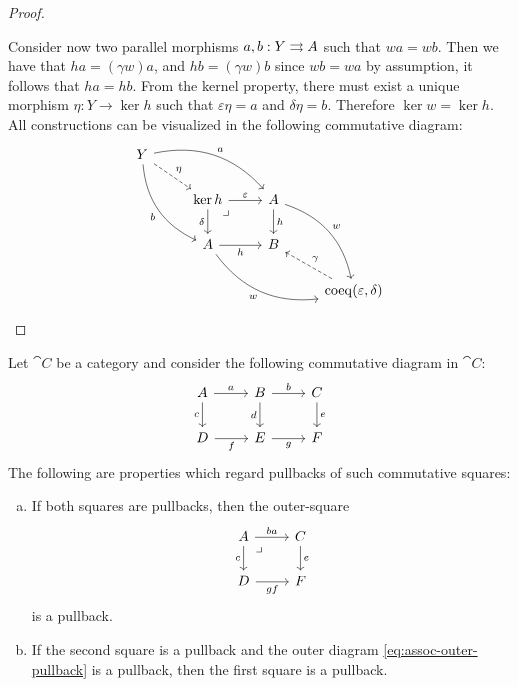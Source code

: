 \begin{proof}
\begin{enumerate}[(a)]
  Consider now two parallel morphisms \(a, b: Y \rightrightarrows A\) such that
  \(w a = w b\). Then we have that \(h a = (\gamma w) a\), and
  \(h b = (\gamma w) b\) since \(w b = w a\) by assumption, it follows that
  \(h a = h b\). From the kernel property, there must exist a unique morphism
  \(\eta: Y \to \ker h\) such that \(\varepsilon \eta = a\) and
  \(\delta \eta = b\). Therefore \(\ker w = \ker h\). All constructions can be
  visualized in the following commutative diagram:
  \[
  \begin{tikzcd}
  Y \ar[rd, dashed, "\eta"]
  \ar[rrd, bend left, "a"]
  \ar[drd, bend right, "b"'] & & &
  \\
  &\ker h \ar[r, "\varepsilon"]
  \ar[rd, phantom, "\lrcorner", very near start]
  \ar[d, "\delta"']
  &A \ar[d, "h"] \ar[drd, bend left, "w"]
  &
  \\
  &A \ar[r, "h"'] \ar[rrd, "w"', bend right]
  &B
  &
  \\
  & & &\Coeq(\varepsilon, \delta) \ar[lu, dashed, "\gamma"']
  \end{tikzcd}
  \]
\end{enumerate}
\end{proof}

\begin{proposition}
\label{prop:associativity-pullbacks}
Let \(\cat C\) be a category and consider the following commutative diagram in
\(\cat C\):
\[
\begin{tikzcd}
A \ar[r, "a"] \ar[d, "c"']
&B \ar[r, "b"] \ar[d, "d"']
&C \ar[d, "e"] \\
D \ar[r, "f"']
&E \ar[r, "g"']
&F
\end{tikzcd}
\]
The following are properties which regard pullbacks of such commutative squares:
\begin{enumerate}[(a)]\setlength\itemsep{0em}
\item If both squares are pullbacks, then the outer-square
  \begin{equation}\label{eq:assoc-outer-pullback}
  \begin{tikzcd}
  A \ar[r, "b a"] \ar[d, "c"']
  \ar[rd, phantom, "\lrcorner", very near start]
  &C \ar[d, "e"] \\
  D \ar[r, "g f"']
  &F
  \end{tikzcd}
  \end{equation}
  is a pullback.

\item If the second square is a pullback and the outer diagram
  \cref{eq:assoc-outer-pullback} is a pullback, then the first square is a
  pullback.
\end{enumerate}
\end{proposition}

